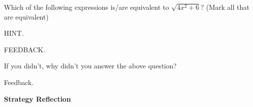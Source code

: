 \documentclass{ximera}
\begin{document}
\begin{problem}
\begin{problem}
    Which of the following expressions is/are equivalent to $\sqrt{4x^2 +6}$? (Mark all that are equivalent)
    
        \begin{hint}
        HINT.
        \end{hint}
        
  \begin{selectAll}
      
          \begin{feedback}[attempt]
          FEEDBACK.
          \end{feedback}

  \end{selectAll}
  
\end{problem}

\begin{question}
  
    If you didn't, why didn't you answer the above question?
  
  \begin{multipleChoice}
      
      \begin{feedback}[attempt]
      Feedback.
      \end{feedback}
      
  \end{multipleChoice}
  
\end{question}

\end{problem}


\begin{center} \textbf{Strategy Reflection} \end{center}
\end{document}
